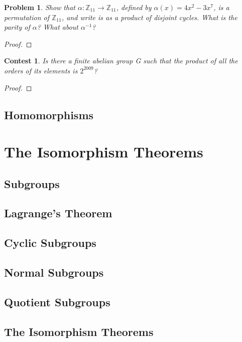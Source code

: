 \documentclass[letter]{amsart}
\newtheorem{problem}[theorem]{Problem}
\newtheorem{Competition}[theorem]{Contest}
\begin{document}
\begin{problem}
  Show that $\alpha : \mathbb{Z}_{11}\to \mathbb{Z}_{11}$, defined by $\alpha(x)=4x^2-3x^7$, is a permutation of $\mathbb{Z}_{11}$, 
  and write is as a product of disjoint cycles. What is the parity of $\alpha$? What about $\alpha^{-1}$?
\end{problem}
\begin{proof}
  
\end{proof}
\begin{Competition}
Is there a finite abelian group G such that the product of all the orders of its elements is $2^{2009}$?
\end{Competition}
\begin{proof}
  
\end{proof}




\subsection{Homomorphisms}



\section{\textbf{The Isomorphism Theorems}}
\subsection{Subgroups}

\subsection{Lagrange's Theorem}

\subsection{Cyclic Subgroups}

\subsection{Normal Subgroups}

\subsection{Quotient Subgroups}

\subsection{The Isomorphism Theorems}
\end{document}
